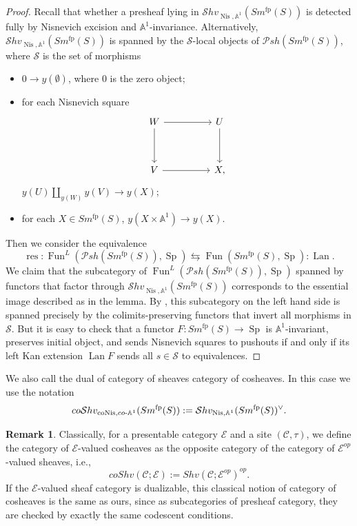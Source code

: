 \documentclass{article}
\theoremstyle{definition}
\newtheorem{rmk}[thm]{Remark}
\newcommand{\on}{\operatorname}
\begin{document}
\begin{proof}
Recall that whether a presheaf lying in $\mathcal{S}hv_{\on{Nis},\mathbb{A}^1}(Sm^{\on{fp}}(S))$ is detected fully by Nisnevich excision and $\mathbb{A}^1$-invariance. Alternatively, $\mathcal{S}hv_{\on{Nis},\mathbb{A}^1}(Sm^{\on{fp}}(S))$ is spanned by the $\mathcal{S}$-local objects of $\mathcal{P}sh(Sm^{\on{fp}}(S))$, where $\mathcal{S}$ is the set of morphisms
\begin{itemize}
\item $0\rightarrow y(\emptyset)$, where $0$ is the zero object;
\item for each Nisnevich square\[\begin{tikzcd}
	W && U \\
	\\
	V && X
	\arrow[from=1-1, to=1-3]
	\arrow[from=1-1, to=3-1]
	\arrow[from=1-3, to=3-3]
	\arrow[from=3-1, to=3-3],
\end{tikzcd}\]
$y(U)\amalg_{y(W)}y(V)\rightarrow y(X)$;
\item for each $X\in Sm^{\on{fp}}(S)$, $y(X\times\mathbb{A}^1)\rightarrow y(X)$.
\end{itemize}
Then we consider the equivalence\[
\on{res}: \on{Fun}^L(\mathcal{P}sh(Sm^{\on{fp}}(S)),\on{Sp})\leftrightarrows\on{Fun}(Sm^{\on{fp}}(S),\on{Sp}): \on{Lan}.\]
We claim that the subcategory of $\on{Fun}^L(\mathcal{P}sh(Sm^{\on{fp}}(S)),\on{Sp})$ spanned by functors that factor through $\mathcal{S}hv_{\on{Nis},\mathbb{A}^1}(Sm^{\on{fp}}(S))$ corresponds to the essential image described as in the lemma. By \cite[Proposition 5.5.4.20]{HTT}, this subcategory on the left hand side is spanned precisely by the colimits-preserving functors that invert all morphisms in $\mathcal{S}$. But it is easy to check that a functor $F:Sm^{\on{fp}}(S)\rightarrow\on{Sp}$ is $\mathbb{A}^1$-invariant, preserves initial object, and sends Nisnevich squares to pushouts if and only if its left Kan extension $\on{Lan}F$ sends all $s\in\mathcal{S}$ to equivalences.
\end{proof}
We also call the dual of category of sheaves category of cosheaves. In this case we use the notation\[
co\mathcal{S}hv_{\on{coNis},co{\text -}\mathbb{A}^1}(Sm^{\on{fp}}(S)):=\mathcal{S}hv_{\on{Nis},\mathbb{A}^1}(Sm^{\on{fp}}(S))^\vee.\]
\begin{rmk}\label{coshv.B.loc}
Classically, for a presentable category $\mathcal{E}$ and a site $(\mathcal{C},\tau)$, we define the category of $\mathcal{E}$-valued cosheaves as the opposite category of the category of $\mathcal{E}^{op}$-valued sheaves, i.e.,\[
coShv(\mathcal{C};\mathcal{E}):=Shv(\mathcal{C};\mathcal{E}^{op})^{op}.\]
If the $\mathcal{E}$-valued sheaf category is dualizable, this classical notion of category of cosheaves is the same as ours, since as subcategories of presheaf category, they are checked by exactly the same codescent conditions.
\end{rmk}
\end{document}

